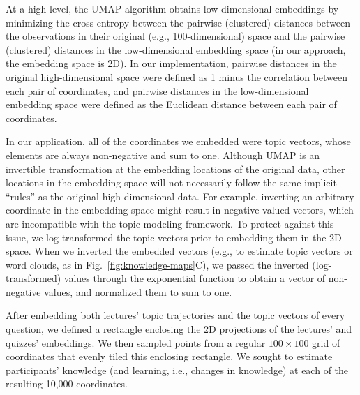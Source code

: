 \documentclass[10pt]{article}
\begin{document}
At a high level, the UMAP algorithm obtains low-dimensional embeddings by
minimizing the cross-entropy between the pairwise (clustered) distances between
the observations in their original (e.g., 100-dimensional) space and the
pairwise (clustered) distances in the low-dimensional embedding space (in our
approach, the embedding space is 2D). In our implementation, pairwise distances
in the original high-dimensional space were defined as 1 minus the correlation
between each pair of coordinates, and pairwise distances in the low-dimensional
embedding space were defined as the Euclidean distance between each pair of
coordinates.

In our application, all of the coordinates we embedded were topic vectors,
whose elements are always non-negative and sum to one. Although UMAP is an
invertible transformation at the embedding locations of the original data,
other locations in the embedding space will not necessarily follow the same
implicit ``rules'' as the original high-dimensional data. For example,
inverting an arbitrary coordinate in the embedding space might result in
negative-valued vectors, which are incompatible with the topic modeling
framework. To protect against this issue, we log-transformed the topic vectors
prior to embedding them in the 2D space. When we inverted the embedded vectors
(e.g., to estimate topic vectors or word clouds, as in
Fig.~\ref{fig:knowledge-maps}C), we passed the inverted (log-transformed)
values through the exponential function to obtain a vector of non-negative
values, and normalized them to sum to one.

After embedding both lectures' topic trajectories and the topic vectors of
every question, we defined a rectangle enclosing the 2D projections of the
lectures' and quizzes' embeddings. We then sampled points from a regular $100
\times 100$ grid of coordinates that evenly tiled this enclosing rectangle. We
sought to estimate participants' knowledge (and learning, i.e., changes in
knowledge) at each of the resulting 10,000 coordinates.
\end{document}
